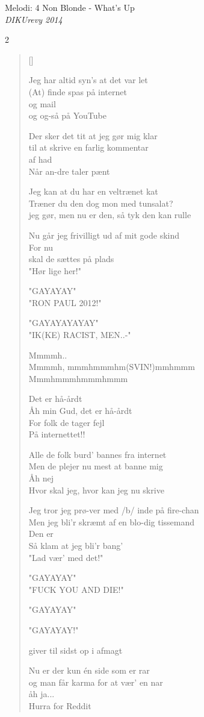 {Melodi: 4 Non Blonde - What's Up}\\[.2em]
{\small\itshape DIKUrevy 2014}
\begin{multicols}2
\settowidth{\versewidth}{Mmmmh, mmmhmmmhm(SVIN!)mmhmmm}
\begin{verse}[\versewidth]

Jeg har altid syn's at det var let\\
(At) finde spas på internet\\
og mail\\
og og-så på YouTube

Der sker det tit   at jeg gør mig klar\\
til at skrive en   farlig kommentar\\
af had\\
Når an-dre taler pænt


  Jeg kan at du har en veltrænet kat\\
Træner du den dog mon med tunsalat?\\
jeg gør, men nu er den, så tyk den kan rulle

Nu går jeg frivilligt ud af mit gode skind\\
For nu\\
skal de sættes på plads\\
"Hør lige her!"

"GAYAYAY"\\
"RON PAUL 2012!"

"GAYAYAYAYAY"\\
"IK(KE) RACIST, MEN..-"


Mmmmh..\\
Mmmmh, mmmhmmmhm(SVIN!)mmhmmm\\
Mmmhmmmhmmmhmmm

Det er hå-årdt\\
Åh min Gud, det er hå-årdt\\
For folk de tager fejl\\
På internettet!!
 
Alle de folk burd' bannes  fra   internet\\
Men de plejer nu mest at banne mig\\
Åh nej\\
  Hvor skal jeg, hvor kan jeg nu skrive

Jeg tror jeg prø-ver med /b/ inde på fire-chan\\
Men jeg bli'r skræmt af en blo-dig tissemand\\
Den er\\
 Så klam at jeg bli'r bang'\\
"Lad vær' med det!"

"GAYAYAY"\\
"FUCK YOU AND DIE!"

"GAYAYAY"

"GAYAYAY!"

giver til sidst op i afmagt

Nu er der kun én side som er rar\\
og man får karma for at vær' en nar\\
åh ja... \\
Hurra for Reddit
\end{verse}
\end{multicols}
